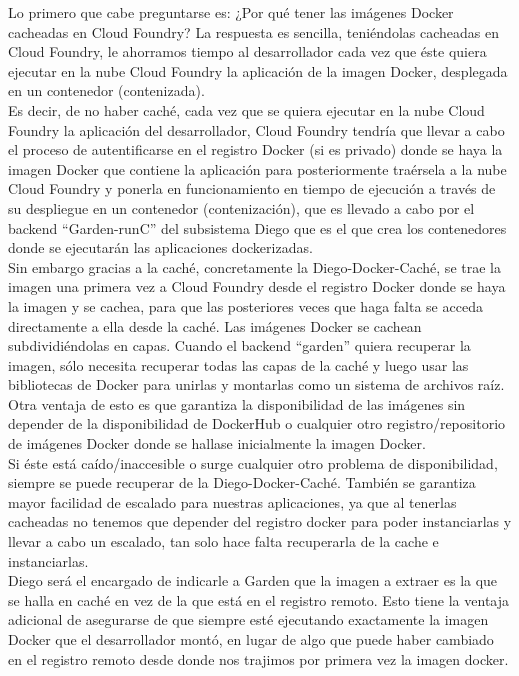 \documentclass[a4paper,11pt]{article}
\begin{document}
Lo primero que cabe preguntarse es: ¿Por qué tener las imágenes Docker cacheadas en Cloud Foundry?
La respuesta es sencilla, teniéndolas cacheadas en Cloud Foundry, le ahorramos tiempo al desarrollador cada vez que éste quiera ejecutar en la nube Cloud Foundry la aplicación de la imagen Docker, desplegada en un contenedor (contenizada).\\
Es decir, de no haber caché, cada vez que se quiera ejecutar en la nube Cloud Foundry la aplicación del desarrollador, Cloud Foundry tendría que llevar a cabo el proceso de autentificarse en el registro Docker (si es privado) donde se haya la imagen Docker que contiene la aplicación para posteriormente traérsela a la nube Cloud Foundry y ponerla en funcionamiento en tiempo de ejecución a través de su despliegue en un contenedor (contenización), que es llevado a cabo por el backend “Garden-runC” del subsistema Diego que es el que crea los contenedores donde se ejecutarán las aplicaciones dockerizadas.\\
Sin embargo gracias a la caché, concretamente la Diego-Docker-Caché, se trae la imagen una primera vez a Cloud Foundry desde el registro Docker donde se haya la imagen y se cachea, para que las posteriores veces que haga falta se acceda directamente a ella desde la caché.
Las imágenes Docker se cachean subdividiéndolas en capas. Cuando el backend “garden” quiera recuperar la imagen, sólo necesita recuperar todas las capas de la caché y luego usar las bibliotecas de Docker para unirlas y montarlas como un sistema de archivos raíz.\\
Otra ventaja de esto es que garantiza la disponibilidad de las imágenes sin depender de la disponibilidad de DockerHub o cualquier otro registro/repositorio de imágenes Docker donde se hallase inicialmente la imagen Docker.\\
Si éste está caído/inaccesible o surge cualquier otro problema de disponibilidad, siempre se puede recuperar de la Diego-Docker-Caché.
También se garantiza mayor facilidad de escalado para nuestras aplicaciones, ya que al tenerlas cacheadas no tenemos que depender del registro docker para poder instanciarlas y llevar a cabo un escalado, tan solo hace falta recuperarla de la cache e instanciarlas.\\
Diego será el encargado de indicarle a Garden que la imagen a extraer es la que se halla en caché en vez de la que está en el registro remoto. Esto tiene la ventaja adicional de asegurarse de que siempre esté ejecutando exactamente la imagen Docker que el desarrollador montó, en lugar de algo que puede haber cambiado en el registro remoto desde donde nos trajimos por primera vez la imagen docker.\\
\end{document}
